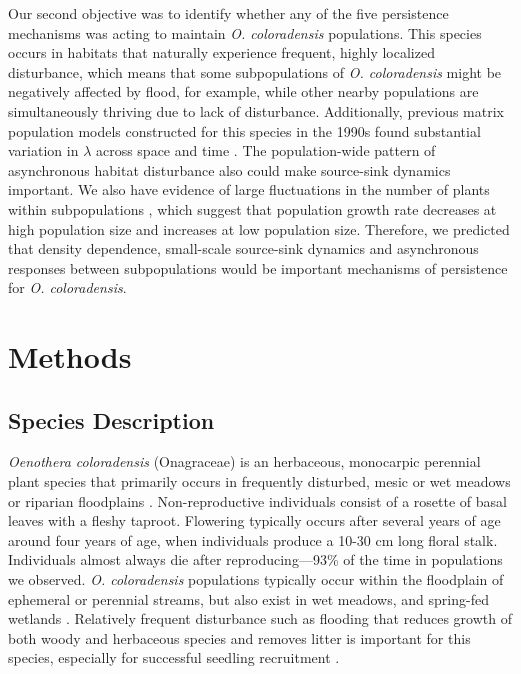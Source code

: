 \documentclass[12pt, letterpaper]{article}
\begin{document}
Our second objective was to identify whether any of the five persistence mechanisms was acting to maintain \textit{O. coloradensis} populations. This species occurs in habitats that naturally experience frequent, highly localized disturbance, which means that some subpopulations of \textit{O. coloradensis} might be negatively affected by flood, for example, while other nearby populations are simultaneously thriving due to lack of disturbance. Additionally, previous matrix population models constructed for this species in the 1990s found substantial variation in $\lambda$ across space and time \cite{Floyd1998}. The population-wide pattern of asynchronous habitat disturbance also could make source-sink dynamics important. We also have evidence of large fluctuations in the number of plants within subpopulations \cite{Heidel202133-YearWyoming}, which suggest that population growth rate decreases at high population size and increases at low population size. Therefore, we predicted that density dependence, small-scale source-sink dynamics and asynchronous responses between subpopulations would be important mechanisms of persistence for \textit{O. coloradensis}.  

\section{Methods}

\subsection{Species Description}  
\textit{Oenothera coloradensis} (Onagraceae) \cite{Wagner2013-ii} is an herbaceous, monocarpic perennial plant species that primarily occurs in frequently disturbed, mesic or wet meadows or riparian floodplains
\cite{Fertig2000-ow}. Non-reproductive individuals consist of a rosette of basal leaves with a fleshy taproot. Flowering typically occurs after several years of age around four years of age, when individuals produce a 10-30 cm long floral stalk. Individuals almost always die after reproducing—93\% of the time in populations we observed. \textit{O. coloradensis} populations typically occur within the floodplain of ephemeral or perennial streams, but also exist in wet meadows, and spring-fed wetlands \cite{Fertig2000-ow}. Relatively frequent disturbance such as flooding that reduces growth of both woody and herbaceous species and removes litter is important for this species, especially for successful seedling recruitment \cite{Fertig2000-ow, Burgess2003}. 
\end{document}
